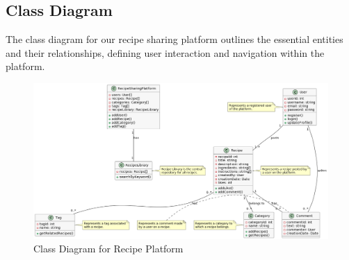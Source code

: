 \subsection{Class Diagram}




The class diagram for our recipe sharing platform outlines the essential entities and their relationships, defining user interaction and navigation within the platform.

\begin{figure}[h]
    \centering
    \includegraphics[width=0.75\linewidth]{sections/BLL/Class_diagram_Boats.png}
    \caption{Class Diagram for Recipe Platform}
    \label{fig:class_diagramRP}
\end{figure}


